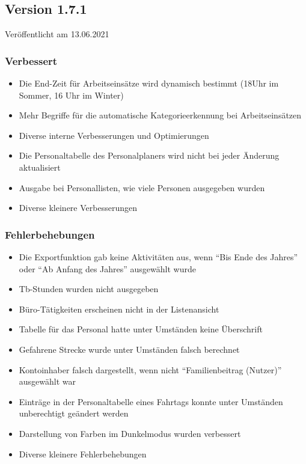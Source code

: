 \begin{neu}
\subsection{Version 1.7.1}
\label{version:1:7:1}
Veröffentlicht am 13.06.2021
\subsubsection{Verbessert}
\begin{itemize}
  \item
  Die End-Zeit für Arbeitseinsätze wird dynamisch bestimmt (18Uhr im Sommer, 16 Uhr im Winter)
  \item
  Mehr Begriffe für die automatische Kategorieerkennung bei Arbeitseinsätzen
  \item
  Diverse interne Verbesserungen und Optimierungen
  \item
  Die Personaltabelle des Personalplaners wird nicht bei jeder Änderung aktualisiert
  \item
  Ausgabe bei Personallisten, wie viele Personen ausgegeben wurden
  \item
  Diverse kleinere Verbesserungen
\end{itemize}

\subsubsection{Fehlerbehebungen}
\begin{itemize}
  \item
  Die Exportfunktion gab keine Aktivitäten aus, wenn "`Bis Ende des Jahres"' oder "`Ab Anfang des Jahres"' ausgewählt wurde
  \item
  Tb-Stunden wurden nicht ausgegeben
  \item
  Büro-Tätigkeiten erscheinen nicht in der Listenansicht
  \item
  Tabelle für das Personal hatte unter Umständen keine Überschrift
  \item
  Gefahrene Strecke wurde unter Umständen falsch berechnet
  \item
  Kontoinhaber falsch dargestellt, wenn nicht "`Familienbeitrag (Nutzer)"' ausgewählt war
  \item
  Einträge in der Personaltabelle eines Fahrtags konnte unter Umständen unberechtigt geändert werden
  \item
  Darstellung von Farben im Dunkelmodus wurden verbessert
  \item
  Diverse kleinere Fehlerbehebungen
\end{itemize}
\end{neu}
